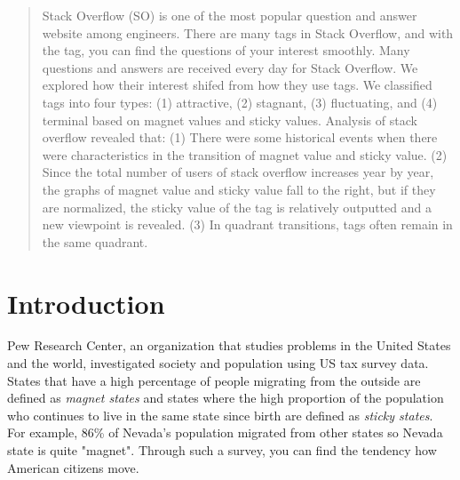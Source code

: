 \documentclass[conference]{IEEEtran}
\begin{document}
\begin{abstract}
Stack Overflow (SO) is one of the most popular question and answer website among engineers. There are many tags in Stack Overflow, and with the tag, you can find the questions of your interest smoothly. Many questions and answers are received every day for Stack Overflow. We explored how their interest shifed from how they use tags. We classified tags into four types: (1) attractive, (2) stagnant, (3) fluctuating, and (4) terminal based on magnet values and sticky values. Analysis of stack overflow revealed that: 
(1) There were some historical events when there were characteristics in the transition of magnet value and sticky value.
(2) Since the total number of users of stack overflow increases year by year, the graphs of magnet value and sticky value fall to the right, but if they are normalized, the sticky value of the tag is relatively outputted and a new viewpoint is revealed.
(3) In quadrant transitions, tags often remain in the same quadrant.
\end{abstract}


\section{Introduction}
Pew Research Center, an organization that studies problems in the United States and the world, investigated society and population using US tax survey data.  States that have a high percentage of people migrating from the outside are defined as \emph{magnet states} and states where the high proportion of the population who continues to live in the same state since birth are defined as \emph{sticky states}. For example, 86\% of Nevada's population migrated from other states so Nevada state is quite "magnet". Through such a survey, you can find the tendency how American citizens move.
\end{document}
